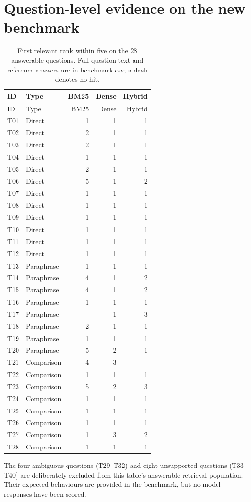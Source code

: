 \documentclass[11pt,a4paper]{article}
\begin{document}
\section{Question-level evidence on the new benchmark}
\begin{longtable}{llrrr}
\caption{First relevant rank within five on the 28 answerable questions. Full question text and reference answers are in benchmark.csv; a dash denotes no hit.}\\
\toprule ID & Type & BM25 & Dense & Hybrid\\\midrule\endfirsthead
\toprule ID & Type & BM25 & Dense & Hybrid\\\midrule\endhead
T01 & Direct & 1 & 1 & 1\\
T02 & Direct & 2 & 1 & 1\\
T03 & Direct & 2 & 1 & 1\\
T04 & Direct & 1 & 1 & 1\\
T05 & Direct & 2 & 1 & 1\\
T06 & Direct & 5 & 1 & 2\\
T07 & Direct & 1 & 1 & 1\\
T08 & Direct & 1 & 1 & 1\\
T09 & Direct & 1 & 1 & 1\\
T10 & Direct & 1 & 1 & 1\\
T11 & Direct & 1 & 1 & 1\\
T12 & Direct & 1 & 1 & 1\\
T13 & Paraphrase & 1 & 1 & 1\\
T14 & Paraphrase & 4 & 1 & 2\\
T15 & Paraphrase & 4 & 1 & 2\\
T16 & Paraphrase & 1 & 1 & 1\\
T17 & Paraphrase & -- & 1 & 3\\
T18 & Paraphrase & 2 & 1 & 1\\
T19 & Paraphrase & 1 & 1 & 1\\
T20 & Paraphrase & 5 & 2 & 1\\
T21 & Comparison & 4 & 3 & --\\
T22 & Comparison & 1 & 1 & 1\\
T23 & Comparison & 5 & 2 & 3\\
T24 & Comparison & 1 & 1 & 1\\
T25 & Comparison & 1 & 1 & 1\\
T26 & Comparison & 1 & 1 & 1\\
T27 & Comparison & 1 & 3 & 2\\
T28 & Comparison & 1 & 1 & 1\\
\bottomrule\end{longtable}
The four ambiguous questions (T29--T32) and eight unsupported questions (T33--T40) are deliberately excluded from this table's answerable retrieval population. Their expected behaviours are provided in the benchmark, but no model responses have been scored.
\end{document}
